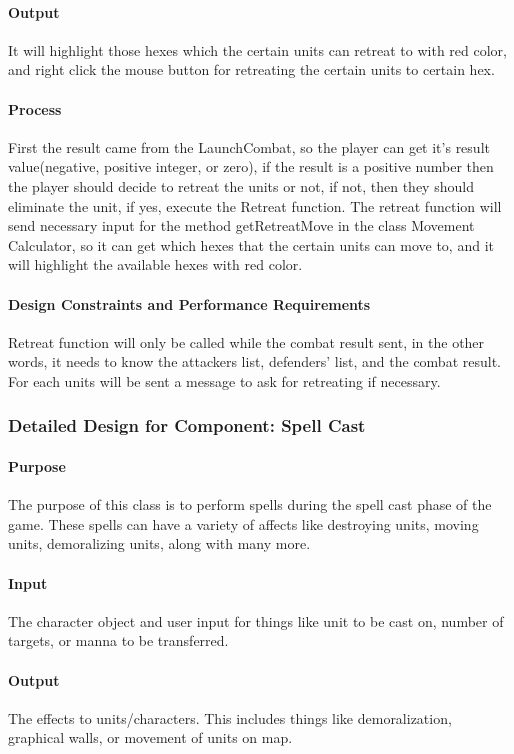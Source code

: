 \documentclass[12pt,a4paper,titlepage]{article}
\begin{document}
\paragraph{Output} It will highlight those hexes which the certain units can retreat to with red color, and right click the mouse button for retreating the certain units to certain hex.
\paragraph{Process} First the result came from the LaunchCombat, so the player can get it's result value(negative, positive integer, or zero), if the result is a positive number then the player should decide to retreat the units or not, if not, then they should eliminate the unit, if yes, execute the Retreat function. The retreat function will send necessary input for the method getRetreatMove in the class Movement Calculator, so it can get which hexes that the certain units can move to, and it will highlight the available hexes with red color.
\paragraph{Design Constraints and Performance Requirements} Retreat function will only be called while the combat result sent, in the other words, it needs to know the attackers list, defenders' list, and the combat result. For each units will be sent a message to ask for retreating if necessary.

\subsubsection{Detailed Design for Component: Spell Cast}
\paragraph{Purpose} The purpose of this class is to perform spells during the spell cast phase of the game.  These spells can have a variety of affects like destroying units, moving units, demoralizing units, along with many more.  
\paragraph{Input} The character object and user input for things like unit to be cast on, number of targets, or manna to be transferred.  
\paragraph{Output} The effects to units/characters.  This includes things like demoralization, graphical walls, or movement of units on map.
\end{document}
